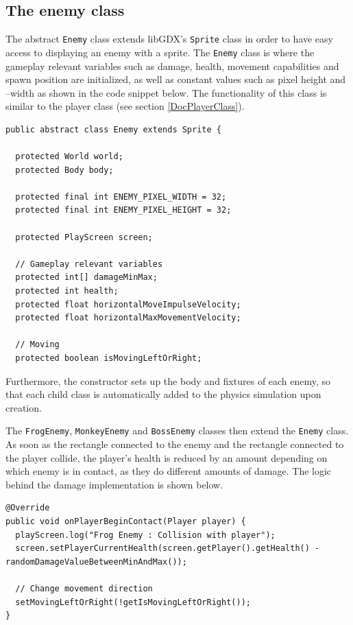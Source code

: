 \documentclass[12p]{article}
\begin{document}

\newpage
\subsection{The enemy class} \label{DocEnemyClass}

The abstract \texttt{Enemy} class extends libGDX's \texttt{Sprite} class in order to have easy access to displaying an enemy with a sprite. The \texttt{Enemy} class is where the gameplay relevant variables such as damage, health, movement capabilities and spawn position are initialized, as well as constant values such as pixel height and –width as shown in the code snippet below. The functionality of this class is similar to the player class (see section \ref{DocPlayerClass}).

\begin{verbatim}
public abstract class Enemy extends Sprite {

  protected World world;
  protected Body body;

  protected final int ENEMY_PIXEL_WIDTH = 32;
  protected final int ENEMY_PIXEL_HEIGHT = 32;

  protected PlayScreen screen;

  // Gameplay relevant variables
  protected int[] damageMinMax;
  protected int health;
  protected float horizontalMoveImpulseVelocity;
  protected float horizontalMaxMovementVelocity;

  // Moving
  protected boolean isMovingLeftOrRight;
\end{verbatim}

Furthermore, the constructor sets up the body and fixtures of each enemy, so that each child class is automatically added to the physics simulation upon creation.

The \texttt{FrogEnemy}, \texttt{MonkeyEnemy} and \texttt{BossEnemy} classes then extend the \texttt{Enemy} class. As soon as the rectangle connected to the enemy and the rectangle connected to the player collide, the player’s health is reduced by an amount depending on which enemy is in contact, as they do different amounts of damage. The logic behind the damage implementation is shown below.

\begin{verbatim}
@Override
public void onPlayerBeginContact(Player player) {
  playScreen.log("Frog Enemy : Collision with player");
  screen.setPlayerCurrentHealth(screen.getPlayer().getHealth() - randomDamageValueBetweenMinAndMax());

  // Change movement direction
  setMovingLeftOrRight(!getIsMovingLeftOrRight());
}
\end{verbatim}
\end{document}
